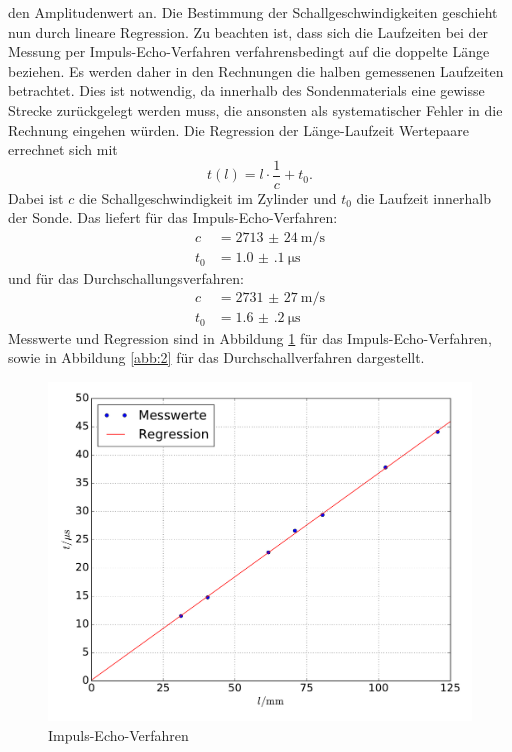 \documentclass[
  bibliography=totoc,     %
  captions=tableheading,  %
  titlepage=firstiscover, %
]{scrartcl}
\begin{document}
den Amplitudenwert an.
Die Bestimmung der Schallgeschwindigkeiten geschieht nun durch lineare Regression.
Zu beachten ist, dass sich die Laufzeiten bei der Messung per Impuls-Echo-Verfahren
verfahrensbedingt auf die doppelte Länge beziehen. Es werden daher in den Rechnungen die halben gemessenen
Laufzeiten betrachtet.
Dies ist notwendig, da innerhalb des Sondenmaterials eine gewisse Strecke zurückgelegt werden
muss, die ansonsten als systematischer Fehler in die Rechnung eingehen würden.
Die Regression der Länge-Laufzeit Wertepaare errechnet sich mit
\begin{equation}
  t(l) = l \cdot \frac{1}{c} + t_0 .
\end{equation}
Dabei ist $c$ die Schallgeschwindigkeit im Zylinder und $t_0$ die Laufzeit innerhalb der
Sonde. Das liefert für das Impuls-Echo-Verfahren:
\begin{align*}
  c &= \SI[per-mode=reciprocal]{2713(24)}{\metre\per\second}\\
  t_0 &= \SI{1.0(1)}{\micro\second}
\end{align*}
und für das Durchschallungsverfahren:
\begin{align*}
  c &= \SI[per-mode=reciprocal]{2731(27)}{\metre\per\second}\\
  t_0 &= \SI{1.6(2)}{\micro\second}
\end{align*}
Messwerte und Regression sind in Abbildung \ref{abb:1} für das Impuls-Echo-Verfahren,
sowie in Abbildung \ref{abb:2} für das Durchschallverfahren dargestellt.
\begin{figure}
  \centering
    \includegraphics[width=\textwidth]{Imp.pdf}
    \caption{Impuls-Echo-Verfahren}
    \label{abb:1}
  \end{figure}
\end{document}
